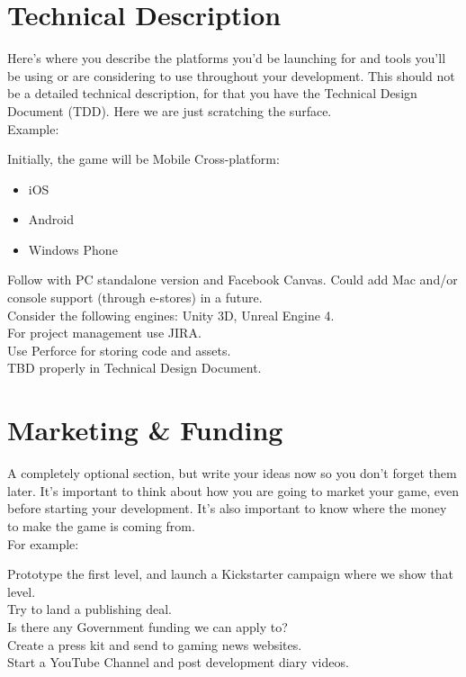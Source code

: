 \documentclass[12pt, a4paper]{article}
\begin{document}
\section{Technical Description}
Here’s where you describe the platforms you’d be launching for and tools you’ll be using or are considering to use throughout your development. This should not be a detailed technical description, for that you have the Technical Design Document (TDD). Here we are just scratching the surface.\\

Example:
\begin{tcolorbox}
Initially, the game will be Mobile Cross-platform:

\begin{itemize}
    \item iOS
    \item Android
    \item Windows Phone
\end{itemize}

Follow with PC standalone version and Facebook Canvas. Could add Mac and/or console support (through e-stores) in a future.\\
Consider the following engines: Unity 3D, Unreal Engine 4.\\
For project management use JIRA.\\
Use Perforce for storing code and assets.\\
TBD properly in Technical Design Document.
\end{tcolorbox}

\section{Marketing \& Funding}
A completely optional section, but write your ideas now so you don’t forget them later. It’s important to think about how you are going to market your game, even before starting your development. It’s also important to know where the money to make the game is coming from.\\

For example:
\begin{tcolorbox}
Prototype the first level, and launch a Kickstarter campaign 
where we show that level.\\

Try to land a publishing deal.\\

Is there any Government funding we can apply to?\\

Create a press kit and send to gaming news websites.\\

Start a YouTube Channel and post development diary 
videos.\\
\end{tcolorbox}
\end{document}
